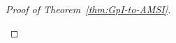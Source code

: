 \begin{proof}[Proof of Theorem~\ref{thm:GpI-to-AMSI}]
\begin{definition}




\end{definition}



\end{proof}
